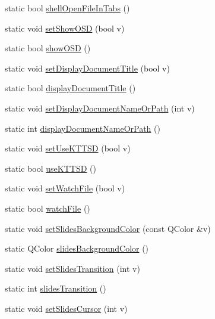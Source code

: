 \begin{DoxyCompactItemize}
\item 
static bool \hyperlink{classOkular_1_1Settings_ace9d0acf8bbd76fb839b48b0f4d2456a}{shell\+Open\+File\+In\+Tabs} ()
\item 
static void \hyperlink{classOkular_1_1Settings_ae04354b647169f5e7ba53999fee6f70a}{set\+Show\+O\+S\+D} (bool v)
\item 
static bool \hyperlink{classOkular_1_1Settings_a51e1023c15867ecdb971e72f5f816ea7}{show\+O\+S\+D} ()
\item 
static void \hyperlink{classOkular_1_1Settings_ad695cea9231304f79fe236ac67168661}{set\+Display\+Document\+Title} (bool v)
\item 
static bool \hyperlink{classOkular_1_1Settings_aa943cf40b1996ca5d38c49550c2ee235}{display\+Document\+Title} ()
\item 
static void \hyperlink{classOkular_1_1Settings_a1b5cc372ab1aeba9f30fea09e80e004d}{set\+Display\+Document\+Name\+Or\+Path} (int v)
\item 
static int \hyperlink{classOkular_1_1Settings_aead6a103beaafc48d790440d89baa42a}{display\+Document\+Name\+Or\+Path} ()
\item 
static void \hyperlink{classOkular_1_1Settings_a4c87ace3b7b2992e132695f39e47603b}{set\+Use\+K\+T\+T\+S\+D} (bool v)
\item 
static bool \hyperlink{classOkular_1_1Settings_acfa116befecb2783eea2eba4216cdc4c}{use\+K\+T\+T\+S\+D} ()
\item 
static void \hyperlink{classOkular_1_1Settings_ac9d0c74e362b975cbd7e9bd6bf536c03}{set\+Watch\+File} (bool v)
\item 
static bool \hyperlink{classOkular_1_1Settings_a59fcf6008ebf043628c1ae2a286d342a}{watch\+File} ()
\item 
static void \hyperlink{classOkular_1_1Settings_af1c12e79cb834fda0edcaa98ff669265}{set\+Slides\+Background\+Color} (const Q\+Color \&v)
\item 
static Q\+Color \hyperlink{classOkular_1_1Settings_a6713709b43c4b90d1ad161c99eab90e8}{slides\+Background\+Color} ()
\item 
static void \hyperlink{classOkular_1_1Settings_aba01839365e0e517f6cdd6a2a3b0488f}{set\+Slides\+Transition} (int v)
\item 
static int \hyperlink{classOkular_1_1Settings_a10ef3acd15a5002f9975b197b8edd338}{slides\+Transition} ()
\item 
static void \hyperlink{classOkular_1_1Settings_a64a2eb7f2a526c20162c0b606b5b0c67}{set\+Slides\+Cursor} (int v)
\item 

\end{DoxyCompactItemize}
